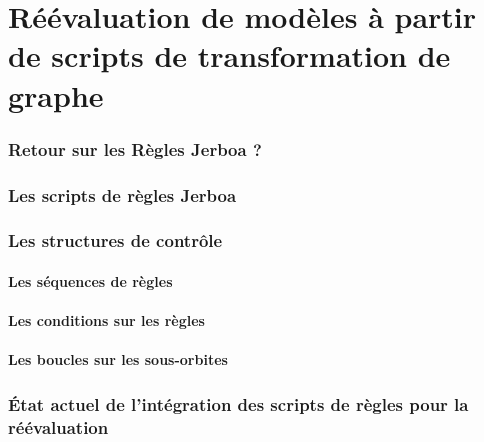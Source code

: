 \part[Réévaluation de modèles à partir de scripts de règles Jerboa]{Réévaluation de modèles à partir de scripts de transformation de graphe}

\section[Retour sur les règles Jerboa ? ]{Retour sur les Règles Jerboa ?}
\label{sec:retour-regle-jerboa}

\section[Les scripts de règles Jerboa]{Les scripts de règles Jerboa}
\label{cha:les-scripts-de}

\section{Les structures de contrôle}
\label{cha:les-structures-de}

\subsection[Les séquences de règles]{Les séquences de règles}
\label{sec:script-sequence}

\subsection[Les conditions sur les règles]{Les conditions sur les règles}
\label{sec:script-condition}

\subsection[Les boucles sur les sous-orbites]{Les boucles sur les sous-orbites}
\label{sec:script-boucle}

\section[État actuel de l'intégration des scripts de règles pour la réévaluation ]{État actuel de l'intégration des scripts de règles pour la réévaluation}
\label{cha:etat-actuel-de}



